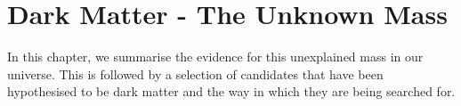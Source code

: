 \chapter{Dark Matter - The Unknown Mass}
\label{chap:dark_matter_evidence}

\par
In this chapter, we summarise the evidence for this unexplained mass in our universe.
This is followed by a selection of candidates that have been hypothesised to be dark matter and the way in which they are being searched for.




